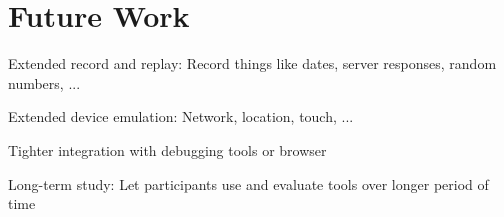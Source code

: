 \section{Future Work}

Extended record and replay: Record things like dates, server responses, random numbers, ...

Extended device emulation: Network, location, touch, ...

Tighter integration with debugging tools or browser

Long-term study: Let participants use and evaluate tools over longer period of time